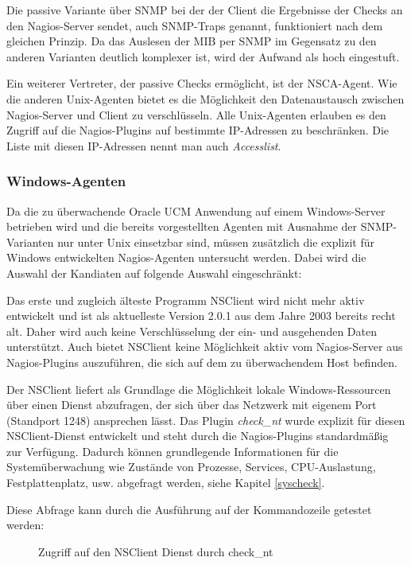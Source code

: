 Die passive Variante über \gls{SNMP} bei der der Client die Ergebnisse der Checks an den Nagios-Server sendet, auch \gls{SNMP}-Traps genannt, funktioniert nach dem gleichen Prinzip.
Da das Auslesen der \gls{MIB} per \gls{SNMP} im Gegensatz zu den anderen Varianten deutlich komplexer ist, wird der Aufwand als hoch eingestuft.

Ein weiterer Vertreter, der passive Checks ermöglicht, ist der \gls{NSCA}-Agent.
Wie die anderen Unix-Agenten bietet es die Möglichkeit den Datenaustausch zwischen Nagios-Server und Client zu verschlüsseln.
Alle Unix-Agenten erlauben es den Zugriff auf die Nagios-Plugins auf bestimmte \gls{IP}-Adressen zu beschränken.
Die Liste mit diesen \gls{IP}-Adressen nennt man auch \textit{Accesslist}.

\subsubsection{Windows-Agenten}
Da die zu überwachende Oracle UCM Anwendung auf einem Windows-Server betrieben wird und die bereits vorgestellten Agenten mit Ausnahme der \gls{SNMP}-Varianten nur unter Unix einsetzbar sind, müssen zusätzlich die explizit für Windows entwickelten Nagios-Agenten untersucht werden.
Dabei wird die Auswahl der Kandiaten auf folgende Auswahl eingeschränkt:



Das erste und zugleich älteste Programm NSClient wird nicht mehr aktiv entwickelt und ist als aktuelleste Version 2.0.1 aus dem Jahre 2003 bereits recht alt.
Daher wird auch keine Verschlüsselung der ein- und ausgehenden Daten unterstützt.
Auch bietet NSClient keine Möglichkeit aktiv vom Nagios-Server aus Nagios-Plugins auszuführen, die sich auf dem zu überwachendem Host befinden.

Der NSClient liefert als Grundlage die Möglichkeit lokale Windows-Ressourcen über einen Dienst abzufragen, der sich über das Netzwerk mit eigenem Port (Standport 1248) ansprechen lässt.
Das Plugin \textit{check\_nt} wurde explizit für diesen NSClient-Dienst entwickelt und steht durch die Nagios-Plugins standardmäßig zur Verfügung.
Dadurch können grundlegende Informationen für die Systemüberwachung wie Zustände von Prozesse, Services, CPU-Auslastung, Festplattenplatz, usw. abgefragt werden, siehe Kapitel \ref{syscheck}.

Diese Abfrage kann durch die Ausführung auf der Kommandozeile getestet werden:

\begin{figure}[ht]
	\centering
		\caption{Zugriff auf den NSClient Dienst durch check\_nt}
		\label{fig:cknt}
\end{figure}

